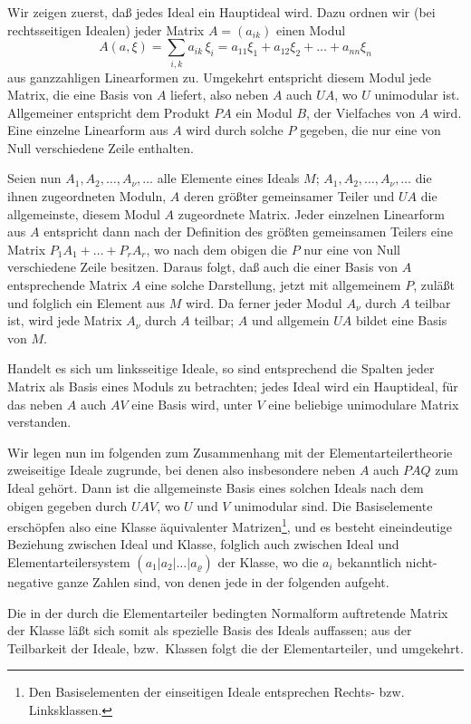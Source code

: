 \documentclass[fontsize=10pt,paper=a5,pagesize,headings=small]{scrbook}
\theoremstyle{plain}
\begin{document}
Wir zeigen zuerst, daß jedes Ideal ein Hauptideal wird. Dazu ordnen
wir (bei rechtsseitigen Idealen) jeder Matrix $A = (a_{ik})$ einen Modul
\[ A(a,\xi) = \sum_{i,k} a_{ik}\,\xi_i = a_{11}\xi_1 + a_{12}\xi_2 + \dots + a_{nn}\xi_n \]
aus ganzzahligen Linearformen zu. Umgekehrt entspricht diesem Modul jede
Matrix, die eine Basis von $A$ liefert, also neben $A$ auch $UA$, wo $U$
unimodular ist. Allgemeiner entspricht dem Produkt $PA$ ein Modul $B$,
der Vielfaches von $A$ wird. Eine einzelne Linearform aus $A$ wird durch
solche $P$ gegeben, die nur eine von Null verschiedene Zeile enthalten.

Seien nun $A_1, A_2,\dots, A_\nu,\dots$ alle Elemente eines Ideals $M$;
$A_1, A_2,\dots, A_\nu,\dots$ die ihnen zugeordneten Moduln, $A$ deren größter
gemeinsamer Teiler und $UA$ die allgemeinste, diesem Modul $A$ zugeordnete
Matrix. Jeder einzelnen Linearform aus $A$ entspricht dann nach der
Definition des größten gemeinsamen Teilers eine Matrix
$P_1 A_1 + \dots + P_r A_r$, wo nach dem obigen die $P$ nur eine von Null
verschiedene Zeile besitzen. Daraus folgt, daß auch die einer Basis von
$A$ entsprechende Matrix $A$ eine solche Darstellung, jetzt mit allgemeinem
$P$, zuläßt und folglich ein Element aus $M$ wird. Da ferner jeder Modul
$A_\nu$ durch $A$ teilbar ist, wird jede Matrix $A_\nu$ durch $A$ teilbar;
$A$ und allgemein $UA$ bildet eine Basis von $M$.

Handelt es sich um linksseitige Ideale, so sind entsprechend die Spalten
jeder Matrix als Basis eines Moduls zu betrachten; jedes Ideal wird ein
Hauptideal, für das neben $A$ auch $AV$ eine Basis wird, unter $V$ eine
beliebige unimodulare Matrix verstanden.

Wir legen nun im folgenden zum Zusammenhang mit der Elementarteiler\-theorie
zweiseitige Ideale zugrunde, bei denen also insbesondere neben $A$
auch $PAQ$ zum Ideal gehört. Dann ist die allgemeinste Basis eines solchen
Ideals nach dem obigen gegeben durch $UAV$, wo $U$ und $V$ unimodular
sind. Die Basiselemente erschöpfen also eine Klasse äquivalenter
Matrizen\footnote{Den Basiselementen der einseitigen Ideale entsprechen
Rechts- bzw. Linksklassen.}, und es besteht eineindeutige Beziehung zwischen
Ideal und Klasse, folglich auch zwischen Ideal und Elementarteilersystem
$(a_1|a_2|\dots|a_\varrho)$ der Klasse, wo die $a_i$ bekanntlich nicht-negative ganze
Zahlen sind, von denen jede in der folgenden aufgeht.

Die in der durch die Elementarteiler bedingten Normalform auftretende
Matrix der Klasse läßt sich somit als spezielle Basis des Ideals auffassen;
aus der Teilbarkeit der Ideale, bzw.~Klassen folgt die der Elementarteiler,
und umgekehrt.
\end{document}
